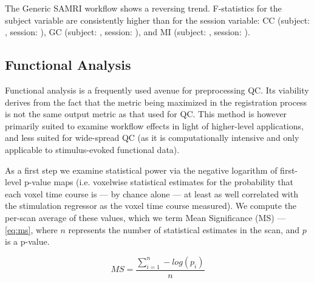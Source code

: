The Generic SAMRI workflow shows a reversing trend.
F-statistics for the subject variable are consistently higher than for the session variable:
CC (subject: , session: ),
GC (subject: , session: ),
and MI (subject: , session: ).


\subsection{Functional Analysis}

Functional analysis is a frequently used avenue for preprocessing QC.
Its viability derives from the fact that the metric being maximized in the registration process is not the same output metric as that used for QC.
This method is however primarily suited to examine workflow effects in light of higher-level applications, and less suited for wide-spread QC (as it is computationally intensive and only applicable to stimulus-evoked functional data).

As a first step we examine statistical power via the negative logarithm of first-level p-value maps (i.e. voxelwise statistical estimates for the probability that each voxel time course is --- by chance alone --- at least as well correlated with the stimulation regressor as the voxel time course measured).
We compute the per-scan average of these values, which we term Mean Significance (MS) --- \cref{eq:ms}, where $n$ represents the number of statistical estimates in the scan, and $p$ is a p-value.

\begin{equation} \label{eq:ms}
        M\!S = \frac{\sum_{i=1}^n -log(p_i)}{n}
\end{equation}

